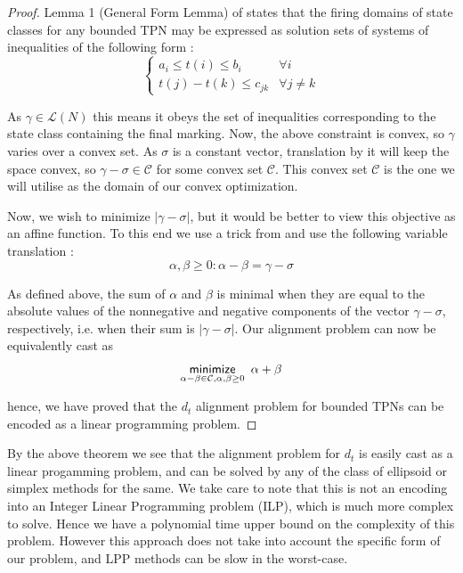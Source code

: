 \documentclass[conference]{IEEEtran}
\newcounter{cases}
\newtheorem{remark}{Remark}
\begin{document}
		\begin{proof}
		Lemma 1 (General Form Lemma) of \cite{BM82} states that the firing domains of state classes for any bounded TPN may be expressed as solution sets of systems of inequalities of the following form :  $$\begin{cases}
			a_i \leq t(i) \leq b_i & \forall i \\ 
			t(j) - t(k) \leq c_{jk} & \forall j \neq k
		\end{cases}$$
		
		As $\gamma \in \mathcal{L}(N)$  this means it obeys the set of inequalities corresponding to the state class containing the final marking. 
		Now, the above constraint is convex, so $\gamma$ varies over a convex set. 
		As $\sigma$ is a constant vector, translation by it will keep the space convex, so $\gamma - \sigma \in \mathcal{C}$ for some convex set $\mathcal{C}$. This convex set $\mathcal{C}$ is the one we will utilise as the domain of our convex optimization. 
		
		Now, we wish to minimize $|\gamma - \sigma|$, but it would be better to view this objective as an affine 
		function. To this end we use a trick from \cite{BV2014} and use the following variable translation : $$\alpha, \beta \geq 0 : \alpha - \beta = \gamma - \sigma$$
		
		As defined above, the sum of $\alpha$ and $\beta$ is minimal when they are equal to the absolute values of the nonnegative and negative components of the vector $\gamma - \sigma$, respectively, i.e. when their sum is $|\gamma - \sigma|$. 
		Our alignment problem can now be equivalently cast as $$\underset{\alpha - \beta \in \mathcal{C}, \alpha, \beta \geq 0}{\mathsf{minimize}} \hspace{0.5em} \alpha + \beta  $$

hence, we have proved that the $d_t$ alignment problem for bounded TPNs can be encoded as a linear programming problem.		\end{proof}

	
		
		By the above theorem we see that the alignment problem for $d_t$ is easily cast as a linear progamming problem, and can be solved by any of the class of ellipsoid or simplex methods for the same.
		We take care to note that this is not an encoding into an Integer Linear Programming problem (ILP), which is much more complex to solve. 
		 Hence we have a polynomial time upper bound on the complexity of this problem. 
		However this approach does not take into account the specific form of our problem, and LPP methods can be slow in the worst-case. 
		
\end{document}
